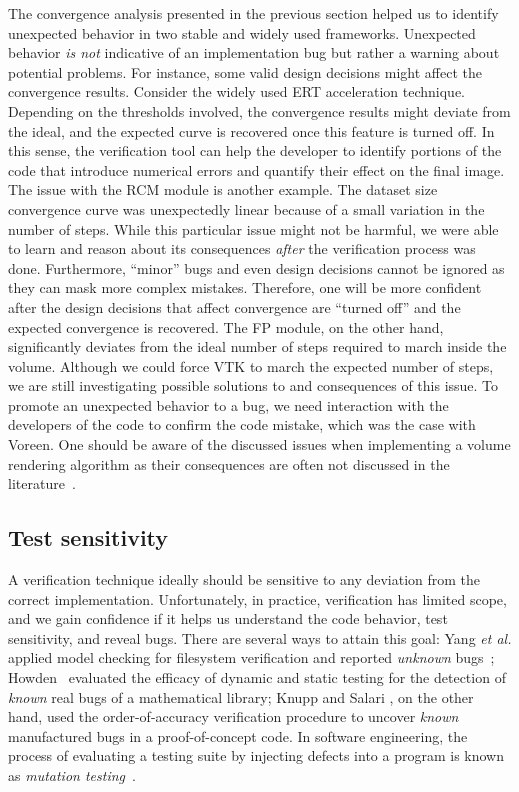The convergence analysis presented in the previous section helped us
to identify unexpected behavior in two stable and widely used
frameworks. Unexpected behavior \emph{is not} indicative of an
implementation bug but rather a warning about potential problems. For
instance, some valid design decisions might affect the convergence
results. Consider the widely used ERT acceleration
technique. Depending on the thresholds involved, the convergence
results might deviate from the ideal, and the expected curve is
recovered once this feature is turned off. In this sense, the
verification tool can help the developer to identify portions of the
code that introduce numerical errors and quantify their effect on the
final image. The issue with the RCM module is another example. The
dataset size convergence curve was unexpectedly linear because of a
small variation in the number of steps. While this particular issue
might not be harmful, we were able to learn and reason about its
consequences \emph{after} the verification process was
done. Furthermore, ``minor'' bugs and even design decisions cannot be
ignored as they can mask more complex mistakes. Therefore, one will be
more confident after the design decisions that affect convergence are
``turned off'' and the expected convergence is recovered.  The FP
module, on the other hand, significantly deviates from the ideal
number of steps required to march inside the volume. Although we could
force VTK to march the expected number of steps, we are still
investigating possible solutions to and consequences of this issue.
To promote an unexpected behavior to a bug, we need interaction with
the developers of the code to confirm the code mistake, which was the
case with Voreen.  One should be aware of the discussed issues when
implementing a volume rendering algorithm as their consequences are
often not discussed in the
literature~\cite{Real-TimeVolumeGraphics06}.

\subsection{Test sensitivity}
\label{sec:test-sesitivity}

A verification technique ideally should be sensitive to any deviation
from the correct implementation. Unfortunately, in practice,
verification has limited scope, and we gain confidence if it helps us
understand the code behavior, test sensitivity, and reveal bugs. There
are several ways to attain this goal: Yang \emph{et al.} applied model
checking for filesystem verification and reported \emph{unknown}
bugs~\cite{Yang:2006:UMC:1189256.1189259};
Howden~\cite{Howden:1980:ASV:357103.357107} evaluated the efficacy of
dynamic and static testing for the detection of \emph{known} real bugs
of a mathematical library; Knupp and Salari \cite{KnuppSalari02}, on
the other hand, used the order-of-accuracy verification procedure to
uncover \emph{known} manufactured bugs in a proof-of-concept code.  In
software engineering, the process of evaluating a testing suite by
injecting defects into a program is known as \emph{mutation
  testing}~\cite{Riley:2009:BTL:1667105}.

